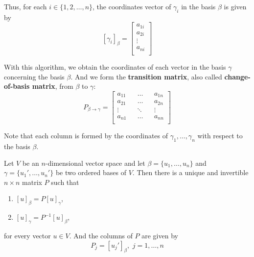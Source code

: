 Thus, for each $i \in \{1, 2, \ldots, n \}$, the coordinates vector of $\gamma_i$ in the basis $\beta$ is given by
\[
	[\gamma_i]_\beta =
	\begin{bmatrix} 
	a_{1i} \\
	a_{2i} \\
	\vdots \\
	a_{ni} \\
	\end{bmatrix}
\]

With this algorithm, we obtain the coordinates of each vector in the basis $\gamma$ concerning the basis $\beta$. And we form the \textbf{transition matrix}, also called \textbf{change-of-basis matrix}, from $\beta$ to $\gamma$:
\[
P_{\beta \to \gamma} =
	\begin{bmatrix} 
	a_{11} && \ldots && a_{1n} \\
	a_{21} && \ldots && a_{2n} \\
	\vdots && \ddots && \vdots \\
	a_{n1} && \ldots && a_{nn} \\
	\end{bmatrix}
\]

Note that each column is formed by the coordinates of $\gamma_1, \ldots, \gamma_n$ with respect to the basis $\beta$.

\begin{theorem}
	Let $V$ be an $n$-dimensional vector space and let $\beta = \{ u_1, \ldots, u_n \}$ and $\gamma = \{ u_1', \ldots, u_n' \}$ be two ordered bases of $V$. Then there is a unique and invertible $n \times n$ matrix $P$ such that 
	\begin{enumerate}
		\item $[u]_\beta = P[u]_\gamma$,
		\item $[u]_\gamma = P^{-1}[u]_\beta$,
	\end{enumerate}
	for every vector $u \in V$. And the columns of $P$ are given by 
	\[
		P_j = [u_j']_\beta, \, \, j = 1, \ldots, n
	\]
\end{theorem}

